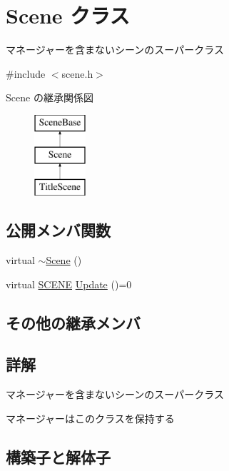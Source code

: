 \hypertarget{class_scene}{}\section{Scene クラス}
\label{class_scene}


マネージャーを含まないシーンのスーパークラス  




{\ttfamily \#include $<$scene.\+h$>$}

Scene の継承関係図\begin{figure}[H]
\begin{center}
\leavevmode
\includegraphics[height=3.000000cm]{class_scene}
\end{center}
\end{figure}
\subsection*{公開メンバ関数}
\begin{DoxyCompactItemize}
\item 
virtual \mbox{\hyperlink{class_scene_aa0a5be58e2ee2d1fdafc5fb46b5e661e}{$\sim$\+Scene}} ()
\item 
virtual \mbox{\hyperlink{scene__base_8h_a24cee5343fb9d0706ead6e8601f363be}{S\+C\+E\+NE}} \mbox{\hyperlink{class_scene_acb50f8104e5a7cfecbdececa7d5f1b39}{Update}} ()=0
\end{DoxyCompactItemize}
\subsection*{その他の継承メンバ}


\subsection{詳解}
マネージャーを含まないシーンのスーパークラス 

マネージャーはこのクラスを保持する 

\subsection{構築子と解体子}
\mbox{\label{class_scene_aa0a5be58e2ee2d1fdafc5fb46b5e661e}} 
